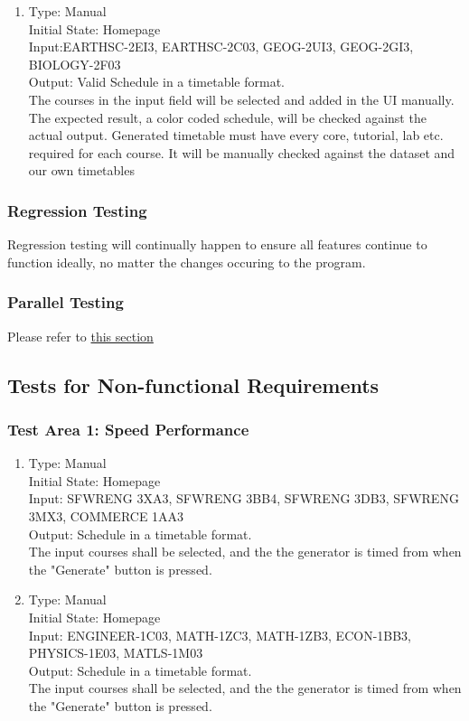 \documentclass[11pt, oneside]{article}   	%
\begin{document}
\begin{enumerate}
\item Type: Manual \\
Initial State: Homepage \\
Input:EARTHSC-2EI3, EARTHSC-2C03, GEOG-2UI3, GEOG-2GI3, BIOLOGY-2F03\\
Output: Valid Schedule in a timetable format. \\
The courses in the input field will be selected and added in the UI manually. The expected result, a color coded schedule, will be checked against the actual output. Generated timetable must have every core, tutorial, lab etc. required for each course. It will be manually checked against the dataset and our own timetables \\
\end{enumerate}

\subsubsection{Regression Testing}
Regression testing will continually happen to ensure all features continue to function ideally, no matter the changes occuring to the program.

\subsubsection{Parallel Testing}
Please refer to \hyperref[sec:compare]{this section}

\subsection{Tests for Non-functional Requirements}
\subsubsection{Test Area 1: Speed Performance}
\begin{enumerate}

\item Type: Manual \\
Initial State: Homepage \\
Input: SFWRENG 3XA3, SFWRENG 3BB4, SFWRENG 3DB3, SFWRENG 3MX3, COMMERCE 1AA3 \\
Output: Schedule in a timetable format. \\
The input courses shall be selected, and the the generator is timed from when the "Generate" button is pressed. \\

\item Type: Manual \\
Initial State: Homepage \\
Input:  ENGINEER-1C03, MATH-1ZC3, MATH-1ZB3,  ECON-1BB3, PHYSICS-1E03, MATLS-1M03 \\
Output: Schedule in a timetable format. \\
The input courses shall be selected, and the the generator is timed from when the "Generate" button is pressed.  \\
\end{enumerate}
\end{document}
